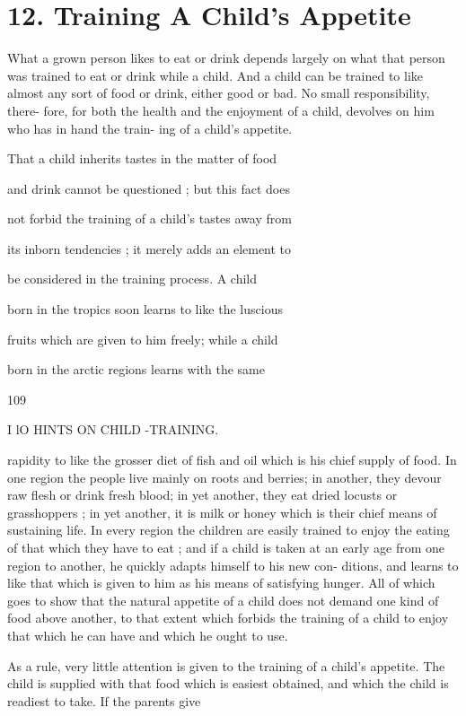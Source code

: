 \documentclass[
]{book}
\begin{document}
\hypertarget{training-a-childs-appetite}{%
\chapter{12. Training A Child's Appetite}\label{training-a-childs-appetite}}

What a grown person likes to eat or drink depends largely on what that person was trained to eat or drink while a child. And a child can be trained to like almost any sort of food or drink, either good or bad. No small responsibility, there- fore, for both the health and the enjoyment of a child, devolves on him who has in hand the train- ing of a child's appetite.

That a child inherits tastes in the matter of food

and drink cannot be questioned ; but this fact does

not forbid the training of a child's tastes away from

its inborn tendencies ; it merely adds an element to

be considered in the training process. A child

born in the tropics soon learns to like the luscious

fruits which are given to him freely; while a child

born in the arctic regions learns with the same

109

I lO HINTS ON CHILD -TRAINING.

rapidity to like the grosser diet of fish and oil which is his chief supply of food. In one region the people live mainly on roots and berries; in another, they devour raw flesh or drink fresh blood; in yet another, they eat dried locusts or grasshoppers ; in yet another, it is milk or honey which is their chief means of sustaining life. In every region the children are easily trained to enjoy the eating of that which they have to eat ; and if a child is taken at an early age from one region to another, he quickly adapts himself to his new con- ditions, and learns to like that which is given to him as his means of satisfying hunger. All of which goes to show that the natural appetite of a child does not demand one kind of food above another, to that extent which forbids the training of a child to enjoy that which he can have and which he ought to use.

As a rule, very little attention is given to the training of a child's appetite. The child is supplied with that food which is easiest obtained, and which the child is readiest to take. If the parents give
\end{document}

